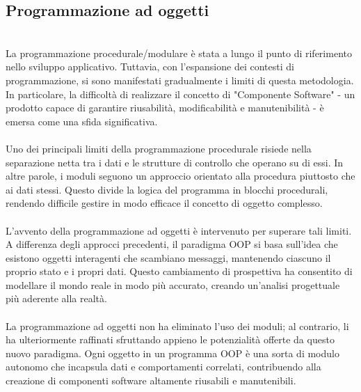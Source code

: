 \documentclass{report}
\begin{document}
\subsection{Programmazione ad oggetti}
\\
La programmazione procedurale/modulare è stata a lungo il punto di riferimento nello sviluppo applicativo. Tuttavia, con l'espansione dei contesti di programmazione, si sono manifestati gradualmente i limiti di questa metodologia. In particolare, la difficoltà di realizzare il concetto di "Componente Software" - un prodotto capace di garantire riusabilità, modificabilità e manutenibilità - è emersa come una sfida significativa.
\\
\\
Uno dei principali limiti della programmazione procedurale risiede nella separazione netta tra i dati e le strutture di controllo che operano su di essi. In altre parole, i moduli seguono un approccio orientato alla procedura piuttosto che ai dati stessi. Questo divide la logica del programma in blocchi procedurali, rendendo difficile gestire in modo efficace il concetto di oggetto complesso.
\\
\\
L'avvento della programmazione ad oggetti è intervenuto per superare tali limiti. A differenza degli approcci precedenti, il paradigma OOP si basa sull'idea che esistono oggetti interagenti che scambiano messaggi, mantenendo ciascuno il proprio stato e i propri dati. Questo cambiamento di prospettiva ha consentito di modellare il mondo reale in modo più accurato, creando un'analisi progettuale più aderente alla realtà.
\\
\\
La programmazione ad oggetti non ha eliminato l'uso dei moduli; al contrario, li ha ulteriormente raffinati sfruttando appieno le potenzialità offerte da questo nuovo paradigma. Ogni oggetto in un programma OOP è una sorta di modulo autonomo che incapsula dati e comportamenti correlati, contribuendo alla creazione di componenti software altamente riusabili e manutenibili.
\end{document}
